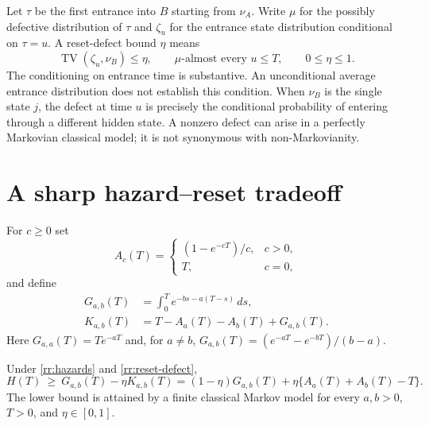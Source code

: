 Let $\tau$ be the first entrance into $B$ starting from $\nu_A$. Write $\mu$ for
the possibly defective distribution of $\tau$ and $\zeta_u$ for the entrance
state distribution conditional on $\tau=u$. A reset-defect bound $\eta$ means
\begin{equation}
 \operatorname{TV}(\zeta_u,\nu_B)\leq\eta,
 \qquad \mu\text{-almost every }u\leq T,
 \qquad 0\leq\eta\leq1.
 \label{rr:reset-defect}
\end{equation}
The conditioning on entrance time is substantive. An unconditional average
entrance distribution does not establish this condition. When $\nu_B$ is the
single state $j$, the defect at time $u$ is precisely the conditional probability
of entering through a different hidden state. A nonzero defect can arise in a
perfectly Markovian classical model; it is not synonymous with non-Markovianity.

\section{A sharp hazard--reset tradeoff}

For $c\geq0$ set
\[
 A_c(T)=\begin{cases}(1-e^{-cT})/c,&c>0,\\T,&c=0,\end{cases}
\]
and define
\begin{align}
 G_{a,b}(T)&=\int_0^T e^{-bs-a(T-s)}\,ds,\label{rr:G}\\
 K_{a,b}(T)&=T-A_a(T)-A_b(T)+G_{a,b}(T).\label{rr:K}
\end{align}
Here $G_{a,a}(T)=Te^{-aT}$ and, for $a\ne b$,
$G_{a,b}(T)=(e^{-aT}-e^{-bT})/(b-a)$.

\begin{theorem}
\label{rr:sharp-reset}
Under \eqref{rr:hazards} and \eqref{rr:reset-defect},
\begin{equation}
 H(T)\ \geq\ G_{a,b}(T)-\eta K_{a,b}(T)
 =(1-\eta)G_{a,b}(T)+\eta\{A_a(T)+A_b(T)-T\}.
 \label{rr:sharp-bound}
\end{equation}
The lower bound is attained by a finite classical Markov model for every
$a,b>0$, $T>0$, and $\eta\in[0,1]$.
\end{theorem}


